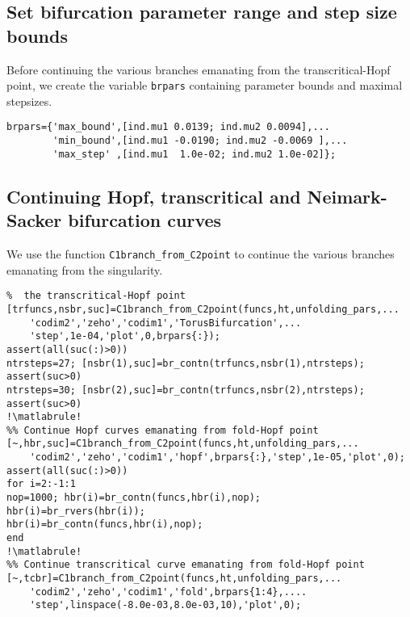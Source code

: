 \subsection{Set bifurcation parameter range and step size bounds}
Before continuing the various branches emanating from the transcritical-Hopf point, we create the variable \lstinline|brpars| containing parameter bounds and maximal stepsizes.
\begin{lstlisting}[style=customMatlab]
%% Set bifurcation parameter range and step size bounds
brpars={'max_bound',[ind.mu1 0.0139; ind.mu2 0.0094],...
        'min_bound',[ind.mu1 -0.0190; ind.mu2 -0.0069 ],...
        'max_step' ,[ind.mu1  1.0e-02; ind.mu2 1.0e-02]};
\end{lstlisting}

\subsection{Continuing Hopf, transcritical and Neimark-Sacker bifurcation curves}
We use the function \lstinline|C1branch_from_C2point| to continue the various branches emanating from the singularity.
\begin{lstlisting}[style=customMatlab,escapechar=!]
%% Continue Neimark-Sacker curves emanating from 
%  the transcritical-Hopf point
[trfuncs,nsbr,suc]=C1branch_from_C2point(funcs,ht,unfolding_pars,...
    'codim2','zeho','codim1','TorusBifurcation',...
    'step',1e-04,'plot',0,brpars{:});
assert(all(suc(:)>0))
ntrsteps=27; [nsbr(1),suc]=br_contn(trfuncs,nsbr(1),ntrsteps);
assert(suc>0)
ntrsteps=30; [nsbr(2),suc]=br_contn(trfuncs,nsbr(2),ntrsteps);
assert(suc>0)
!\matlabrule!
%% Continue Hopf curves emanating from fold-Hopf point
[~,hbr,suc]=C1branch_from_C2point(funcs,ht,unfolding_pars,...
    'codim2','zeho','codim1','hopf',brpars{:},'step',1e-05,'plot',0);
assert(all(suc(:)>0))
for i=2:-1:1
nop=1000; hbr(i)=br_contn(funcs,hbr(i),nop);
hbr(i)=br_rvers(hbr(i));
hbr(i)=br_contn(funcs,hbr(i),nop);
end
!\matlabrule!
%% Continue transcritical curve emanating from fold-Hopf point
[~,tcbr]=C1branch_from_C2point(funcs,ht,unfolding_pars,...
    'codim2','zeho','codim1','fold',brpars{1:4},....
    'step',linspace(-8.0e-03,8.0e-03,10),'plot',0);
\end{lstlisting}

